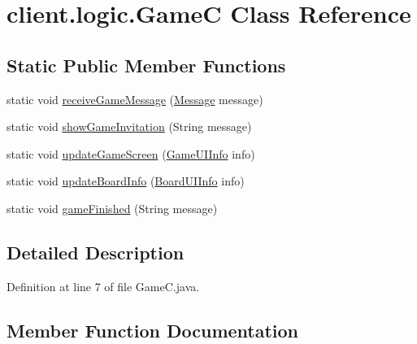 \hypertarget{classclient_1_1logic_1_1_game_c}{}\section{client.\+logic.\+GameC Class Reference}
\label{classclient_1_1logic_1_1_game_c}
\subsection*{Static Public Member Functions}
\begin{DoxyCompactItemize}
\item 
static void \hyperlink{classclient_1_1logic_1_1_game_c_a70979b2783537bb175c0a8926680e236}{receive\+Game\+Message} (\hyperlink{classpt_1_1up_1_1fe_1_1lpro1613_1_1sharedlib_1_1structs_1_1_message}{Message} message)
\item 
static void \hyperlink{classclient_1_1logic_1_1_game_c_a62c530e593e489903a8ab6557763be27}{show\+Game\+Invitation} (String message)
\item 
static void \hyperlink{classclient_1_1logic_1_1_game_c_a5efa8858529daa61b2c4639b9a7c2949}{update\+Game\+Screen} (\hyperlink{classpt_1_1up_1_1fe_1_1lpro1613_1_1sharedlib_1_1structs_1_1_game_u_i_info}{Game\+U\+I\+Info} info)
\item 
static void \hyperlink{classclient_1_1logic_1_1_game_c_a055e1c7cadc523d1c851af8856b0214d}{update\+Board\+Info} (\hyperlink{classpt_1_1up_1_1fe_1_1lpro1613_1_1sharedlib_1_1structs_1_1_board_u_i_info}{Board\+U\+I\+Info} info)
\item 
static void \hyperlink{classclient_1_1logic_1_1_game_c_afee9b1e47ab82d704759506c4cb5e2ad}{game\+Finished} (String message)
\end{DoxyCompactItemize}


\subsection{Detailed Description}


Definition at line 7 of file Game\+C.\+java.



\subsection{Member Function Documentation}
\hypertarget{classclient_1_1logic_1_1_game_c_afee9b1e47ab82d704759506c4cb5e2ad}{}\label{classclient_1_1logic_1_1_game_c_afee9b1e47ab82d704759506c4cb5e2ad} 
